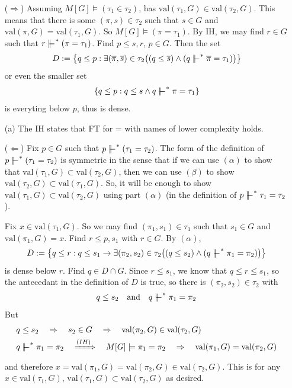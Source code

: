 \documentclass[12pt,a4paper]{article}
\newenvironment{proof}
{\begin{changemargin}{0.5cm}{0.5cm} 
	}%
	{\end{changemargin}
}
\newenvironment{p}
{\begin{proof} 
	}%
	{\end{proof}
}
\begin{document}
\begin{p}
\begin{itemize}
($\Rightarrow$) Assuming $M[G] \models (\tau_1 \in \tau_2)$, has $\text{val}(\tau_1, G) \in \text{val}(\tau_2, G)$. This means that there is some $(\pi, s) \in \tau_2$ such that $s\in G$ and $\text{val}(\pi, G) = \text{val}(\tau_1, G)$. So $M[G] \models(\pi = \tau_1)$. By IH, we may find $r \in G$ such that $r \forces^* (\pi = \tau_1)$. Find $p\leq s,r$, $p\in G$. Then the set
\begin{align*}
D:= \big\{q\leq p : \exists (\bar{\pi}, \bar{s}) \in \tau_2 \big( (q\leq \bar{s}) \wedge (q\forces^* \bar{\pi} =\tau_1) \big) \big\}
\end{align*}
or even the smaller set
\begin{align*}
\{q\leq p :  q\leq s \wedge q\forces^* \pi = \tau_1 \}
\end{align*}
is everyting below $p$, thus is dense.
\item[(a)] The IH states that FT for = with names of lower complexity holds.

($\Leftarrow$) Fix $p\in G$ such that $p\forces^* (\tau_1 =\tau_2)$. The form of the definition of $p\forces^* (\tau_1 = \tau_2)$ is symmetric in the sense that if we can use $(\alpha)$ to show that $\text{val}(\tau_1, G) \subset \text{val}(\tau_2, G)$, then we can use $(\beta)$ to show $\text{val}(\tau_2, G) \subset \text{val}(\tau_1, G)$. So, it will be enough to show $\text{val}(\tau_1, G) \subset \text{val}(\tau_2, G)$ using part $(\alpha)$ (in the definition of $p\forces^* \tau_1 =\tau_2$).

\quad Fix $x\in \text{val}(\tau_1, G)$. So we may find $(\pi_1, s_1) \in \tau_1$ such that $s_1\in G$ and $\text{val}(\pi_1, G) =x$. Find $r\leq p, s_1$ with $r\in G$. By $(\alpha)$,
\begin{align*}
D:= \big\{ q\leq r: q\leq s_1 \rightarrow \exists (\pi_2, s_2) \in \tau_2 \big( (q\leq s_2) \wedge (q\forces^* \pi_1 =\pi_2) \big) \big\}
\end{align*}
is dense below $r$. Find $q\in D \cap G$. Since $r\leq s_1$, we know that $q\leq r\leq s_1$, so the antecedant in the definition of $D$ is true, so there is $(\pi_2, s_2) \in \tau_2$ with
\begin{align*}
q\leq s_2 \quad \text{and} \quad q\forces^* \pi_1 = \pi_2
\end{align*}
But
\begin{align*}
& q\leq s_2 \quad  \Rightarrow  \quad s_2 \in G \quad \Rightarrow \quad \text{val}(\pi_2, G) \in \text{val}(\tau_2, G) \\
& q\forces^* \pi_1= \pi_2 \quad \xRightarrow{(IH)} \quad M[G] \models \pi_1 = \pi_2 \quad \Rightarrow \quad \text{val}(\pi_1, G) = \text{val}(\pi_2, G) 
\end{align*}
and therefore $x =\text{val}(\pi_1, G) =\text{val}(\pi_2, G)\in \text{val}(\tau_2, G)$. This is for any $x\in \text{val}(\tau_1, G)$, $\text{val}(\tau_1, G) \subset \text{val}(\tau_2, G)$ as desired.
\s


\end{itemize}
\end{p}
\end{document}
